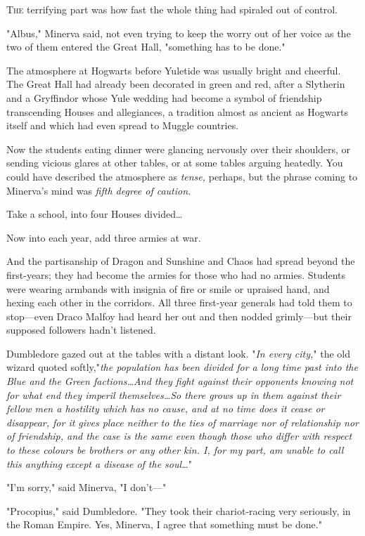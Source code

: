 
\lettrine{T}{he} terrifying part was how fast the whole thing had spiraled out of control.

"Albus," Minerva said, not even trying to keep the worry out of her voice as
the two of them entered the Great Hall, "something has to be done."

The atmosphere at Hogwarts before Yuletide was usually bright and cheerful. The
Great Hall had already been decorated in green and red, after a Slytherin and a
Gryffindor whose Yule wedding had become a symbol of friendship transcending
Houses and allegiances, a tradition almost as ancient as Hogwarts itself and
which had even spread to Muggle countries.

Now the students eating dinner were glancing nervously over their shoulders, or
sending vicious glares at other tables, or at some tables arguing heatedly. You
could have described the atmosphere as \emph{tense,} perhaps, but the phrase
coming to Minerva's mind was \emph{fifth degree of caution.}

Take a school, into four Houses divided…

Now into each year, add three armies at war.

And the partisanship of Dragon and Sunshine and Chaos had spread beyond the
first-years; they had become the armies for those who had no armies. Students
were wearing armbands with insignia of fire or smile or upraised hand, and
hexing each other in the corridors. All three first-year generals had told them
to stop---even Draco Malfoy had heard her out and then nodded grimly---but
their supposed followers hadn't listened.

Dumbledore gazed out at the tables with a distant look. "\emph{In every city,}"
the old wizard quoted softly,"\emph{the population has been divided for a long
time past into the Blue and the Green factions…And they fight against
their opponents knowing not for what end they imperil themselves…So
there grows up in them against their fellow men a hostility which has no cause,
and at no time does it cease or disappear, for it gives place neither to the
ties of marriage nor of relationship nor of friendship, and the case is the
same even though those who differ with respect to these colours be brothers or
any other kin. I, for my part, am unable to call this anything except a disease
of the soul…}"

"I'm sorry," said Minerva, "I don't---"

"Procopius," said Dumbledore. "They took their chariot-racing very seriously,
in the Roman Empire. Yes, Minerva, I agree that something must be done."

